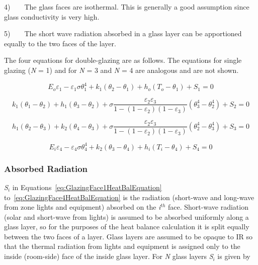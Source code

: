 4)~~~~The glass faces are isothermal. This is generally a good assumption since glass conductivity is very high.

5)~~~~The short wave radiation absorbed in a glass layer can be apportioned equally to the two faces of the layer.

The four equations for double-glazing are as follows. The equations for single glazing (\emph{N} = 1) and for \emph{N} = 3 and \emph{N} = 4 are analogous and are not shown.

\begin{equation}
{E_o}{\varepsilon_1} - {\varepsilon_1}\sigma \theta_1^4 + {k_1}\left( {{\theta_2} - {\theta_1}} \right) + {h_o}\left( {{T_o} - {\theta_1}} \right) + {S_1} = 0
\label{eq:GlazingFace1HeatBalEquation}
\end{equation}

\begin{equation}
{k_1}\left( {{\theta_1} - {\theta_2}} \right) + {h_1}\left( {{\theta_3} - {\theta_2}} \right) + \sigma \frac{{{\varepsilon_2}{\varepsilon_3}}}{{1 - \left( {1 - {\varepsilon_2}} \right)\left( {1 - {\varepsilon_3}} \right)}}\left( {\theta_3^4 - \theta_2^4} \right) + {S_2} = 0
\end{equation}

\begin{equation}
{h_1}({\theta_2} - {\theta_3}) + {k_2}({\theta_4} - {\theta_3}) + \sigma \frac{{{\varepsilon_2}{\varepsilon_3}}}{{1 - \left( {1 - {\varepsilon_2}} \right)\left( {1 - {\varepsilon_3}} \right)}}\left( {\theta_2^4 - \theta_3^4} \right) + {S_3} = 0
\end{equation}

\begin{equation}
{E_i}{\varepsilon_4} - {\varepsilon_4}\sigma \theta_4^4 + {k_2}\left( {{\theta_3} - {\theta_4}} \right) + {h_i}\left( {{T_i} - {\theta_4}} \right) + {S_4} = 0
\label{eq:GlazingFace4HeatBalEquation}
\end{equation}

\subsubsection{Absorbed Radiation}\label{absorbed-radiation}

\emph{S\(_{i}\)} in Equations~\ref{eq:GlazingFace1HeatBalEquation} to~\ref{eq:GlazingFace4HeatBalEquation} is the radiation (short-wave and long-wave from zone lights and equipment) absorbed on the \emph{i}\(^{th}\) face. Short-wave radiation (solar and short-wave from lights) is assumed to be absorbed uniformly along a glass layer, so for the purposes of the heat balance calculation it is split equally between the two faces of a layer. Glass layers are assumed to be opaque to IR so that the thermal radiation from lights and equipment is assigned only to the inside (room-side) face of the inside glass layer. For \emph{N} glass layers \emph{S\(_{i}\)} is given by

